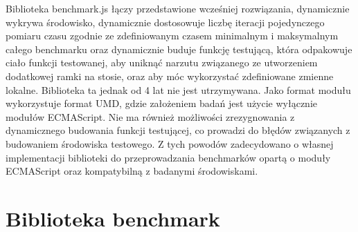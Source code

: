 Biblioteka benchmark.js łączy przedstawione wcześniej rozwiązania, dynamicznie wykrywa środowisko, dynamicznie dostosowuje liczbę iteracji pojedynczego pomiaru czasu zgodnie ze zdefiniowanym czasem minimalnym i maksymalnym całego benchmarku oraz dynamicznie buduje funkcję testującą, która odpakowuje ciało funkcji testowanej, aby uniknąć narzutu związanego ze utworzeniem dodatkowej ramki na stosie, oraz aby móc wykorzystać zdefiniowane zmienne lokalne. Biblioteka ta jednak od 4 lat nie jest utrzymywana. Jako format modułu wykorzystuje format UMD, gdzie założeniem badań jest użycie wyłącznie modułów ECMAScript. Nie ma również możliwości zrezygnowania z dynamicznego budowania funkcji testującej, co prowadzi do błędów związanych z budowaniem środowiska testowego. Z tych powodów zadecydowano o własnej implementacji biblioteki do przeprowadzania benchmarków opartą o moduły ECMAScript oraz kompatybilną z badanymi środowiskami.

\section{Biblioteka benchmark}

